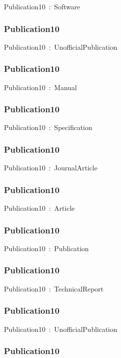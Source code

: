 \documentclass{article}
\begin{document}
Publication10~:~Software

\subsubsection*{Publication10}

Publication10~:~UnofficialPublication

\subsubsection*{Publication10}

Publication10~:~Manual

\subsubsection*{Publication10}

Publication10~:~Specification

\subsubsection*{Publication10}

Publication10~:~JournalArticle

\subsubsection*{Publication10}

Publication10~:~Article

\subsubsection*{Publication10}

Publication10~:~Publication

\subsubsection*{Publication10}

Publication10~:~TechnicalReport

\subsubsection*{Publication10}

Publication10~:~UnofficialPublication

\subsubsection*{Publication10}
\end{document}
